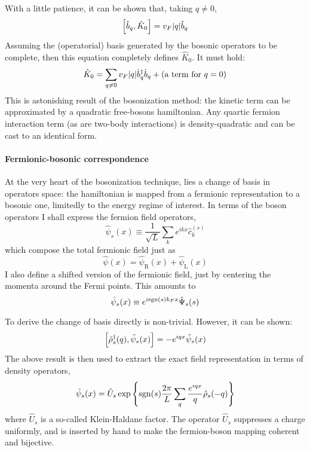 With a little patience, it can be shown that, taking $q \neq 0$,
\begin{equation}\label{eq:boson-hamiltonian-commutator}
	\comm{\hat b_q}{\hat K_0} = v_F \abs{q} \hat b_q
\end{equation}
Assuming the (operatorial) basis generated by the bosonic operators to be complete, then this equation completely defines $\hat K_0$. It must hold:
\[
	\hat K_0 = \sum_{q \neq 0} v_F \abs{q} \hat b_q^\dagger \hat b_q + (\text{a term for $q=0$})
\]
This is astonishing result of the bosonization method: the kinetic term can be approximated by a quadratic free-bosons hamiltonian. Any quartic fermion interaction term (as are two-body interactions) is density-quadratic and can be cast to an identical form.

\paragraph{Fermionic-bosonic correspondence}
At the very heart of the bosonization technique, lies a change of basis in operators space: the hamiltonian is mapped from a fermionic representation to a bosonic one, limitedly to the energy regime of interest. In terms of the boson operators I shall express the fermion field operators,
\[
	\hat \psi_s (x) \equiv \frac{1}{\sqrt{L}} \sum_k e^{ikx} \hat c_k^{(s)}
\]
which compose the total fermionic field just as
\[
	\hat \psi(x) = \hat \psi_\mathrm{R}(x) + \hat \psi_\mathrm{L}(x)
\]
I also define a shifted version of the fermionic field, just by centering the momenta around the Fermi points. This amounts to
\begin{equation}\label{eq:shifted-fermionic-fields-definition}
	\hat \psi_s (x) \equiv e^{i \mathrm{sgn}(s) k_F x} \hat \Psi_s (s)
\end{equation}

To derive the change of basis directly is non-trivial. However, it can be shown:
\[
	\comm{\hat \rho_s^\dagger (q)}{\hat \psi_s (x)} = -e^{iqx} \hat \psi_s (x)
\]
The above result is then used to extract the exact field representation in terms of density operators,
\begin{equation}\label{eq:fermionic-fields-density-expression}
	\hat \psi_s (x) = \hat U_s \exp\left\{ \mathrm{sgn}(s) \frac{2\pi}{L} \sum_q \frac{e^{iqx}}{q} \hat \rho_s (-q) \right\}
\end{equation}
where $\hat U_s$ is a so-called Klein-Haldane factor. The operator $\hat U_s$ suppresses a charge uniformly, and is inserted by hand to make the fermion-boson mapping coherent and bijective.

